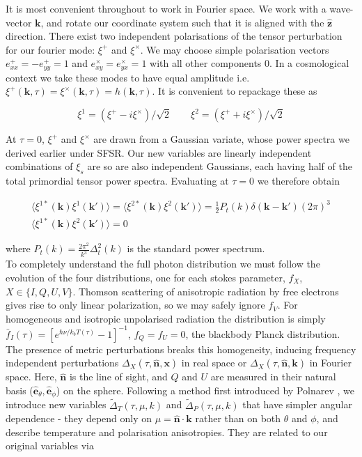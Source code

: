 \documentclass[a4paper,10pt]{article}
\renewcommand{\v}[1]{\mathbf{#1}}
\newcommand{\half}{\frac{1}{2}}
\newcommand{\unit}[1]{\hat{\v{#1}}}
\begin{document}
It is most convenient throughout to work in Fourier space.  We work with a wave-vector $\v{k}$, and rotate our coordinate system such that it is aligned with the $\unit{z}$ direction. There exist two independent polarisations of the tensor perturbation for our fourier mode: $\xi^+$ and $\xi^\times$. We may choose simple polarisation vectors $e^+_{xx}=-e^+_{yy}=1$ and $e^\times_{xy}=e^\times_{yx}=1$ with all other components 0. In a cosmological context we take these modes to have equal amplitude i.e. $\xi^+(\v{k},\tau)=\xi^\times(\v{k},\tau)=h(\v{k},\tau)$. It is convenient to repackage these as

\begin{equation}
\xi^1 = (\xi^+ - i\xi^\times)/\sqrt{2} \qquad \xi^2 = (\xi^+ + i\xi^\times)/\sqrt{2}
\end{equation}

At $\tau=0$, $\xi^+$ and $\xi^\times$ are drawn from a Gaussian variate, whose power spectra we derived earlier under SFSR. Our new variables are linearly independent combinations of $\xi_s$ are so are also independent Gaussians, each having half of the total primordial tensor power spectra. Evaluating at $\tau=0$ we therefore obtain

\begin{equation}
\begin{split}
\langle \xi^{1*}(\v{k})\xi^{1}(\v{k'})\rangle=\langle \xi^{2*}(\v{k})\xi^{2}(\v{k'})\rangle=\half P_t(k)\delta(\v{k}-\v{k'})(2\pi)^3\\
\langle \xi^{1*}(\v{k})\xi^{2}(\v{k'})\rangle=0
\end{split}
\label{statprops}
\end{equation}

where $P_t(k) = \frac{2\pi^2}{k^3}\Delta_t^2(k)$ is the standard power spectrum.\\

To completely understand the full photon distribution we must follow the evolution of the four distributions, one for each stokes parameter, $f_X$, $X\in\{I,Q,U,V\}$. Thomson scattering of anisotropic radiation by free electrons gives rise to only linear polarization, so we may safely ignore $f_V$. For homogeneous and isotropic unpolarised radiation the distribution is simply $\bar{f}_I(\tau)= [e^{\hbar \nu/k_b T(\tau)}-1]^{-1}$, $f_Q=f_U=0$, the blackbody Planck distribution. The presence of metric perturbations breaks this homogeneity, inducing frequency independent perturbations $\Delta_X(\tau,\unit{n},\v{x})$ in real space or $\Delta_X(\tau,\unit{n},\v{k})$ in Fourier space. Here, $\unit{n}$ is the line of sight, and $Q$ and $U$ are measured in their natural basis ($\unit{e}_\theta, \unit{e}_\phi$) on the sphere. Following a method first introduced by Polnarev \cite{Polnarev}, we introduce new variables $\tilde{\Delta}_T(\tau,\mu,k)$ and $\tilde{\Delta}_P(\tau,\mu,k)$ that have simpler angular dependence - they depend only on $\mu=\unit{n}\cdot\v{k}$ rather than on both $\theta$  and $\phi$, and describe temperature and polarisation anisotropies. They are related to our original variables via
\end{document}
